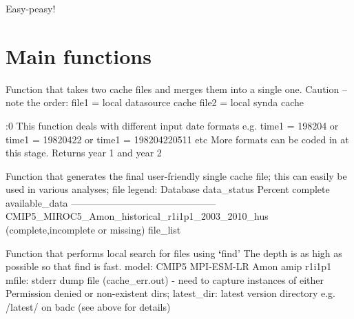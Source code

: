 \documentclass[letterpaper,10pt,english]{sphinxmanual}
\begin{document}
Easy-peasy!

\section*{Main functions}


\begin{fulllineitems}
\label{\detokenize{index:cmip5datafinder.cache_merge}}
Function that takes two cache files and merges them
into a single one. Caution -- note the order:
file1 = local datasource cache
file2 = local synda cache

\end{fulllineitems}


\begin{fulllineitems}
:0
\label{\detokenize{index:cmip5datafinder.date_handling}}
This function deals with different input date formats e.g.
time1 = 198204 or
time1 = 19820422 or
time1 = 198204220511 etc
More formats can be coded in at this stage.
Returns year 1 and year 2

\end{fulllineitems}


\begin{fulllineitems}
\label{\detokenize{index:cmip5datafinder.final_cache}}
Function that generates the final user-friendly
single cache file; this can easily be used
in various analyses; file legend:
Database \textbar{} data\_status \textbar{} Percent complete \textbar{} available\_data
---------------------------------------------
CMIP5\_MIROC5\_Amon\_historical\_r1i1p1\_2003\_2010\_hus (complete,incomplete or missing) file_list

\end{fulllineitems}


\begin{fulllineitems}
\label{\detokenize{index:cmip5datafinder.find_local_files}}
Function that performs local search for files using {\color{red}\bfseries{}{}`}find'
The depth is as high as possible so that find is fast.
model: CMIP5 MPI-ESM-LR Amon amip r1i1p1
mfile: stderr dump file (cache\_err.out) - need to capture
instances of either Permission denied or non-existent dirs;
latest\_dir: latest version directory e.g. /latest/ on badc
(see above for details)

\end{fulllineitems}
\end{document}
